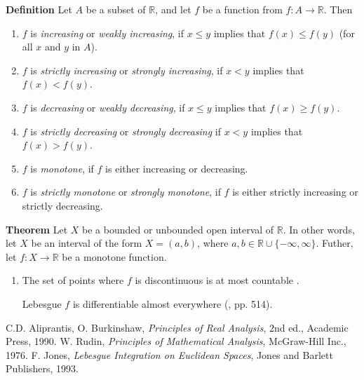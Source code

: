 \documentclass[12pt]{article}
\begin{document}
\newcommand{\sR}[0]{\mathbb{R}}


{\bf Definition}
Let $A$ be a subset of $\sR$, and let $f$ be a function from $f:A\to \sR$.
Then
\begin{enumerate}
\item $f$ is \emph{increasing} or \emph{weakly increasing}, if
$x\le y$ implies that $f(x)\le f(y)$ (for all $x$ and $y$ in $A$).
\item $f$ is \emph{strictly increasing} or \emph{strongly increasing}, if
$x< y$ implies that $f(x)< f(y)$.
\item $f$ is \emph{decreasing} or \emph{weakly decreasing}, if
$x\le y$ implies that $f(x)\ge f(y)$.
\item $f$ is \emph{strictly decreasing} or \emph{strongly decreasing} if
$x< y$ implies that $f(x)> f(y)$.
\item $f$ is \emph{monotone},
if $f$ is either increasing or decreasing.
\item $f$ is \emph{strictly monotone} or \emph{strongly monotone},
if $f$ is either strictly increasing or strictly decreasing.
\end{enumerate}

{\bf Theorem} Let $X$ be a bounded or unbounded open interval of $\sR$.
In other words, let $X$ be an interval of the form $X=(a,b)$, where $a,b\in\sR\cup\{-\infty,\infty\}$.
Futher, let $f:X\to \sR$ be a monotone function. 
\begin{enumerate}
\item The set of points where $f$ is discontinuous is at most 
countable \cite{aliprantis, rudin}. 
\item [Lebesgue] $f$ is differentiable almost 
everywhere (\cite{jones}, pp. 514). 
\end{enumerate}

\begin{thebibliography}{9}
 C.D. Aliprantis, O. Burkinshaw, \emph{Principles of Real Analysis},
 2nd ed., Academic Press, 1990.
 W. Rudin, \emph{Principles of Mathematical Analysis}, McGraw-Hill Inc., 1976.
F. Jones, \emph{Lebesgue Integration on Euclidean Spaces}, 
Jones and Barlett Publishers, 1993.
 \end{thebibliography}
\end{document}
